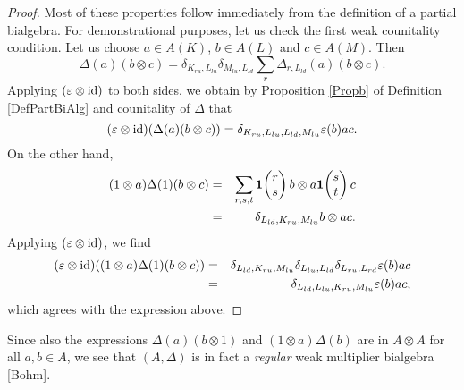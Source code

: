 \begin{proof} Most of these properties follow immediately from the definition of a partial bialgebra. For demonstrational purposes, let us check the first weak counitality condition. Let us choose $a\in A(K)$, $b\in A(L)$ and $c\in A(M)$. Then \[\Delta(a)(b\otimes c) = \delta_{K_{ru},L_{lu}}\delta_{M_{lu},L_{ld}} \sum_r \Delta_{r,L_{ld}}(a)(b\otimes c).\]  Applying $(\varepsilon\otimes \operatorname{id})$ to both sides, we obtain by Proposition \ref{Propb} of Definition \ref{DefPartBiAlg} and counitality of $\Delta$ that \[(\varepsilon \otimes \operatorname{id})(\Delta(a)(b\otimes c)) = \delta_{K_{ru},L_{lu},L_{ld},M_{lu}} \varepsilon(b) ac.\] On the other hand, \begin{eqnarray*} (1\otimes a)\Delta(1)(b\otimes c) &=& \sum_{r,s,t} \mathbf{1}\!\begin{pmatrix} r \\ s\end{pmatrix} b \otimes a\mathbf{1}\!\begin{pmatrix} s \\ t\end{pmatrix}c \\ &=& \delta_{L_{ld},K_{ru},M_{lu}} b \otimes ac.\end{eqnarray*} Applying $(\varepsilon\otimes \operatorname{id})$, we find \begin{eqnarray*} (\varepsilon\otimes \operatorname{id})( (1\otimes a)\Delta(1)(b\otimes c) ) &=&  \delta_{L_{ld},K_{ru},M_{lu}}\delta_{L_{lu},L_{ld}}\delta_{L_{ru},L_{rd}} \varepsilon(b)ac \\ &=&  \delta_{L_{ld},L_{lu},K_{ru},M_{lu}} \varepsilon(b)ac,\end{eqnarray*} which agrees with the expression above.
\end{proof} 

\begin{Rem} 
Since also the expressions $\Delta(a)(b\otimes 1)$ and $(1\otimes a)\Delta(b)$ are in $A\otimes A$ for all $a,b\in A$, we see that $(A,\Delta)$ is in fact a \emph{regular} weak multiplier bialgebra [Bohm].
\end{Rem} 




